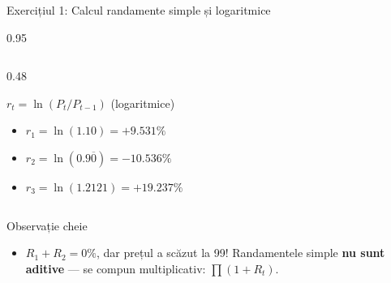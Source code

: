\documentclass[9pt, aspectratio=169, t]{beamer}
\begin{document}
\begin{frame}[shrink=5]{Exercițiul 1: Calcul randamente simple și logaritmice}
\begin{cminipage}{0.95\textwidth}
\begin{columns}[T]
\begin{column}{0.48\textwidth}
\begin{exampleblock}{$r_t = \ln(P_t / P_{t-1})$ (logaritmice)}
    \begin{itemize}\setlength{\itemsep}{0pt}
        \item $r_1 = \ln(1.10) = \mathbf{+9.531\%}$
        \item $r_2 = \ln(0.9\overline{0}) = \mathbf{-10.536\%}$
        \item $r_3 = \ln(1.2121) = \mathbf{+19.237\%}$
    \end{itemize}
    \end{exampleblock}
    \end{column}
    \end{columns}
    \vspace{0.1cm}
    \begin{alertblock}{Observație cheie}
    \begin{itemize}\setlength{\itemsep}{0pt}
        \item $R_1 + R_2 = 0\%$, dar prețul a scăzut la 99! Randamentele simple \textbf{nu sunt aditive} --- se compun multiplicativ: $\prod(1+R_t)$.
    \end{itemize}
    \end{alertblock}
    \end{cminipage}
\end{frame}
\end{document}
